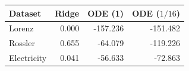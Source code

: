 \begin{tabular}{lrrr}
\toprule
Dataset & Ridge & ODE (1) & ODE ($1/16$) \\
\midrule
Lorenz & 0.000 & -157.236 & -151.482 \\
Rossler & 0.655 & -64.079 & -119.226 \\
Electricity & 0.041 & -56.633 & -72.863 \\
\bottomrule
\end{tabular}

